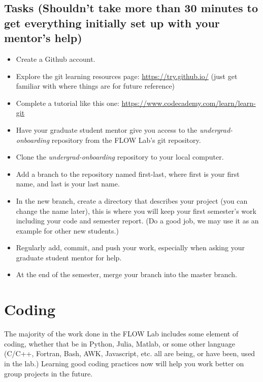 \documentclass[]{article}%
\begin{document}
\subsection{Tasks (Shouldn't take more than 30 minutes to get everything initially set up with your mentor's help)}
\begin{itemize}
	\item Create a Github account.
	\item Explore the git learning resources page: \url{https://try.github.io/} (just get familiar with where things are for future reference)
	\item Complete a tutorial like this one: \url{https://www.codecademy.com/learn/learn-git}
	\item Have your graduate student mentor give you access to the \textit{undergrad-onboarding} repository from the FLOW Lab's git repository.
	\item Clone the \textit{undergrad-onboarding} repository to your local computer.
	\item Add a branch to the repository named first-last, where first is your first name, and last is your last name.
	\item In the new branch, create a directory that describes your project (you can change the name later), this is where you will keep your first semester's work including your code and semester report. (Do a good job, we may use it as an example for other new students.)
	\item Regularly add, commit, and push your work, especially when asking your graduate student mentor for help.
	\item At the end of the semester, merge your branch into the master branch.
\end{itemize}



\section{Coding}
The majority of the work done in the FLOW Lab includes some element of coding, whether that be in Python, Julia, Matlab, or some other language (C/C++, Fortran, Bash, AWK, Javascript, etc. all are being, or have been, used in the lab.) Learning good coding practices now will help you work better on group projects in the future.
\end{document}
